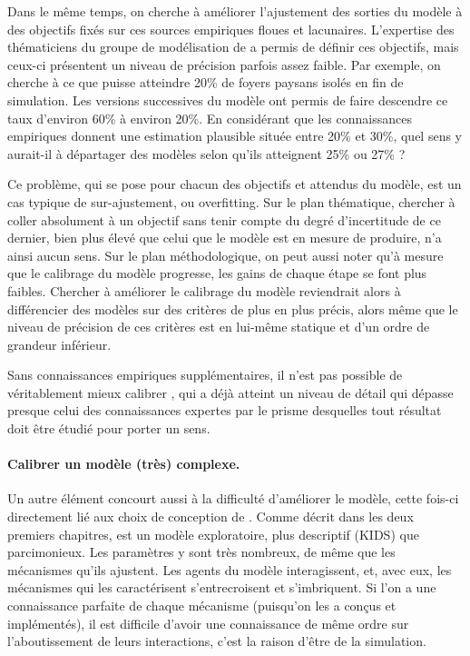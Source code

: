 Dans le même temps, on cherche à améliorer l'ajustement des sorties du modèle à des objectifs fixés sur ces sources empiriques floues et lacunaires.
L'expertise des thématiciens du groupe de modélisation de \simfeodal{} a permis de définir ces objectifs, mais ceux-ci présentent un niveau de précision parfois assez faible.
Par exemple, on cherche à ce que \simfeodal{} puisse atteindre 20\% de foyers paysans isolés en fin de simulation.
Les versions successives du modèle ont permis de faire descendre ce taux d'environ 60\% à environ 20\%.
En considérant que les connaissances empiriques donnent une estimation plausible située entre 20\% et 30\%, quel sens y aurait-il à départager des modèles selon qu'ils atteignent 25\% ou 27\% ?

Ce problème, qui se pose pour chacun des objectifs et attendus du modèle, est un cas typique de sur-ajustement, ou \og overfitting\fg{}.
Sur le plan thématique, chercher à coller absolument à un objectif sans tenir compte du degré d'incertitude de ce dernier, bien plus élevé que celui que le modèle est en mesure de produire, n'a ainsi aucun sens.
Sur le plan méthodologique, on peut aussi noter qu'à mesure que le calibrage du modèle progresse, les \og gains\fg{} de chaque étape se font plus faibles.
Chercher à améliorer le calibrage du modèle reviendrait alors à différencier des modèles sur des critères de plus en plus précis, alors même que le niveau de précision de ces critères est en lui-même statique et d'un ordre de grandeur inférieur.

Sans connaissances empiriques supplémentaires, il n'est pas possible de véritablement mieux calibrer \simfeodal{}, qui a déjà atteint un niveau de détail qui dépasse presque celui des connaissances expertes par le prisme desquelles tout résultat doit être étudié pour porter un sens.


\paragraph{Calibrer un modèle (très) complexe.}
Un autre élément concourt aussi à la difficulté d'améliorer le modèle, cette fois-ci directement lié aux choix de conception de \simfeodal{}.
Comme décrit dans les deux premiers chapitres, \simfeodal{} est un modèle exploratoire, plus descriptif (KIDS) que parcimonieux.
Les paramètres y sont très nombreux, de même que les mécanismes qu'ils ajustent.
Les agents du modèle interagissent, et, avec eux, les mécanismes qui les caractérisent s'entrecroisent et s'imbriquent.
Si l'on a une connaissance parfaite de chaque mécanisme (puisqu'on les a conçus et implémentés), il est difficile d'avoir une connaissance de même ordre sur l'aboutissement de leurs interactions, c'est la raison d'être de la simulation.

